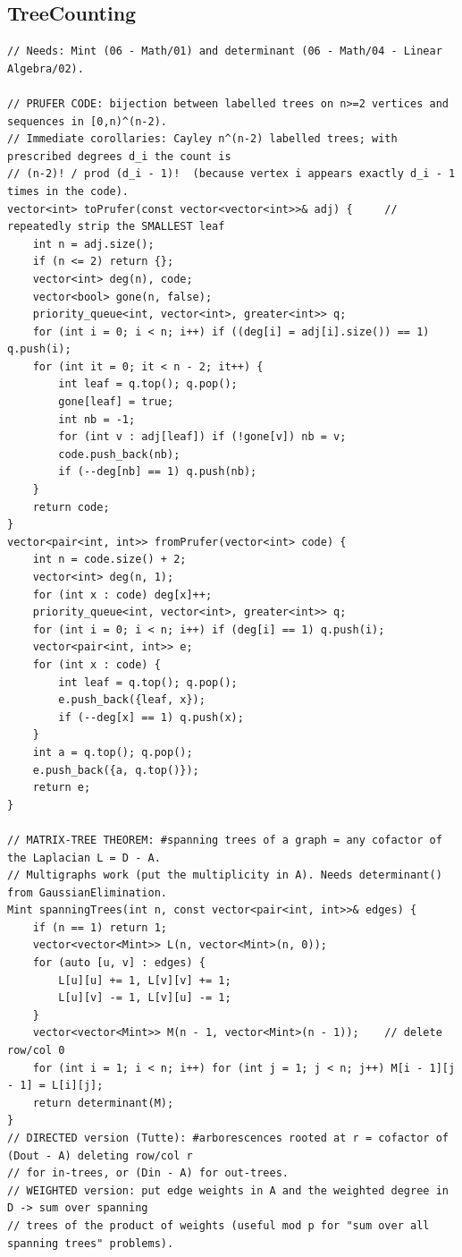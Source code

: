 \documentclass[9pt,a4paper,twocolumn]{extarticle}
\begin{document}
\filbreak
\subsection{TreeCounting}
\nopagebreak
\begin{lstlisting}
// Needs: Mint (06 - Math/01) and determinant (06 - Math/04 - Linear Algebra/02).

// PRUFER CODE: bijection between labelled trees on n>=2 vertices and sequences in [0,n)^(n-2).
// Immediate corollaries: Cayley n^(n-2) labelled trees; with prescribed degrees d_i the count is
// (n-2)! / prod (d_i - 1)!  (because vertex i appears exactly d_i - 1 times in the code).
vector<int> toPrufer(const vector<vector<int>>& adj) {     // repeatedly strip the SMALLEST leaf
    int n = adj.size();
    if (n <= 2) return {};
    vector<int> deg(n), code;
    vector<bool> gone(n, false);
    priority_queue<int, vector<int>, greater<int>> q;
    for (int i = 0; i < n; i++) if ((deg[i] = adj[i].size()) == 1) q.push(i);
    for (int it = 0; it < n - 2; it++) {
        int leaf = q.top(); q.pop();
        gone[leaf] = true;
        int nb = -1;
        for (int v : adj[leaf]) if (!gone[v]) nb = v;
        code.push_back(nb);
        if (--deg[nb] == 1) q.push(nb);
    }
    return code;
}
vector<pair<int, int>> fromPrufer(vector<int> code) {
    int n = code.size() + 2;
    vector<int> deg(n, 1);
    for (int x : code) deg[x]++;
    priority_queue<int, vector<int>, greater<int>> q;
    for (int i = 0; i < n; i++) if (deg[i] == 1) q.push(i);
    vector<pair<int, int>> e;
    for (int x : code) {
        int leaf = q.top(); q.pop();
        e.push_back({leaf, x});
        if (--deg[x] == 1) q.push(x);
    }
    int a = q.top(); q.pop();
    e.push_back({a, q.top()});
    return e;
}

// MATRIX-TREE THEOREM: #spanning trees of a graph = any cofactor of the Laplacian L = D - A.
// Multigraphs work (put the multiplicity in A). Needs determinant() from GaussianElimination.
Mint spanningTrees(int n, const vector<pair<int, int>>& edges) {
    if (n == 1) return 1;
    vector<vector<Mint>> L(n, vector<Mint>(n, 0));
    for (auto [u, v] : edges) {
        L[u][u] += 1, L[v][v] += 1;
        L[u][v] -= 1, L[v][u] -= 1;
    }
    vector<vector<Mint>> M(n - 1, vector<Mint>(n - 1));    // delete row/col 0
    for (int i = 1; i < n; i++) for (int j = 1; j < n; j++) M[i - 1][j - 1] = L[i][j];
    return determinant(M);
}
// DIRECTED version (Tutte): #arborescences rooted at r = cofactor of (Dout - A) deleting row/col r
// for in-trees, or (Din - A) for out-trees.
// WEIGHTED version: put edge weights in A and the weighted degree in D -> sum over spanning
// trees of the product of weights (useful mod p for "sum over all spanning trees" problems).


\end{lstlisting}
\end{document}
